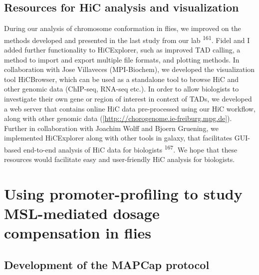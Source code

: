 \documentclass[11pt,twoside]{MPIthesis}
\theoremstyle{definition}
\theoremstyle{definition}
\theoremstyle{definition}
\theoremstyle{remark}
\begin{document}
\subsection{Resources for HiC analysis and
visualization}\label{resources-for-hic-analysis-and-visualization}

During our analysis of chromosome conformation in flies, we improved on
the methods developed and presented in the last study from our lab
\textsuperscript{161}. Fidel and I added further functionality to
HiCExplorer, such as improved TAD calling, a method to import and export
multiple file formats, and plotting methods. In collaboration with Jose
Villaveces (MPI-Biochem), we developed the visualization tool
HiCBrowser, which can be used as a standalone tool to browse HiC and
other genomic data (ChIP-seq, RNA-seq etc.). In order to allow
biologists to investigate their own gene or region of interest in
context of TADs, we developed a web server that contains online HiC data
pre-processed using our HiC workflow, along with other genomic data
({[}{\url{http:://chorogenome.ie-freiburg.mpg.de}}{]}). Further in
collaboration with Joachim Wolff and Bjoern Gruening, we implemented
HiCExplorer along with other tools in galaxy, that facilitates GUI-based
end-to-end analysis of HiC data for biologists \textsuperscript{167}. We
hope that these resources would facilitate easy and user-friendly HiC
analysis for biologists.

\section{Using promoter-profiling to study MSL-mediated dosage
compensation in
flies}\label{using-promoter-profiling-to-study-msl-mediated-dosage-compensation-in-flies}

\subsection{Development of the MAPCap
protocol}\label{development-of-the-mapcap-protocol}
\end{document}
